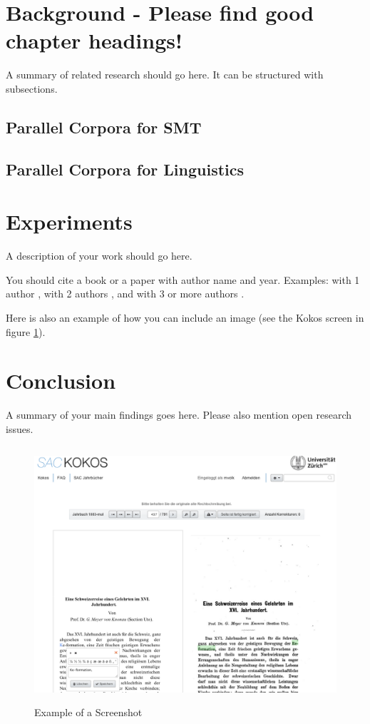 \documentclass[11pt]{article}
\begin{document}
\section{Background - Please find good chapter headings!}

A summary of related research should go here. It can be structured with subsections.

\subsection{Parallel Corpora for SMT}

\subsection{Parallel Corpora for Linguistics}

\section{Experiments}

A description of your work should go here.

You should cite a book or a paper with author name and year. Examples: with 1 author \cite{Koehn2005}, with 2 authors \cite{Jurafsky2009}, and with 3 or more authors \cite{Masc2014}.

Here is also an example of how you can include an image (see the Kokos screen in figure \ref{Kokos_screen}).

\section{Conclusion}

A summary of your main findings goes here. Please also mention open research issues.



\begin{figure}
\begin{center}
\includegraphics[height=9.5cm]{Kokos_Screen_Shot.png}
\end{center}
\caption{Example of a Screenshot} \label{Kokos_screen}
\end{figure}

 




\end{document}
